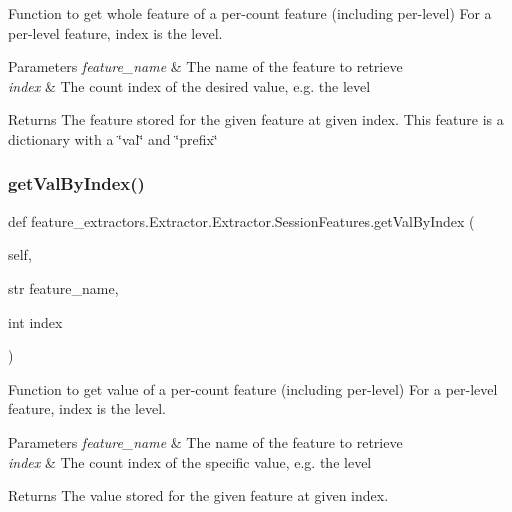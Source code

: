 Function to get whole feature of a per-\/count feature (including per-\/level) For a per-\/level feature, index is the level. 


\begin{DoxyParams}{Parameters}
{\em feature\+\_\+name} & The name of the feature to retrieve \\
\hline
{\em index} & The count index of the desired value, e.\+g. the level \\
\hline
\end{DoxyParams}
\begin{DoxyReturn}{Returns}
The feature stored for the given feature at given index. This feature is a dictionary with a \char`\"{}val\char`\"{} and \char`\"{}prefix\char`\"{} 
\end{DoxyReturn}
\mbox{\label{classfeature__extractors_1_1_extractor_1_1_extractor_1_1_session_features_a239bd49dfe33736f8c76edccfa7a50b2}} 
\subsubsection{\texorpdfstring{getValByIndex()}{getValByIndex()}}
{\footnotesize\ttfamily def feature\+\_\+extractors.\+Extractor.\+Extractor.\+Session\+Features.\+get\+Val\+By\+Index (\begin{DoxyParamCaption}\item[{}]{self,  }\item[{str}]{feature\+\_\+name,  }\item[{int}]{index }\end{DoxyParamCaption})}



Function to get value of a per-\/count feature (including per-\/level) For a per-\/level feature, index is the level. 


\begin{DoxyParams}{Parameters}
{\em feature\+\_\+name} & The name of the feature to retrieve \\
\hline
{\em index} & The count index of the specific value, e.\+g. the level \\
\hline
\end{DoxyParams}
\begin{DoxyReturn}{Returns}
The value stored for the given feature at given index. 
\end{DoxyReturn}
\mbox{\label{classfeature__extractors_1_1_extractor_1_1_extractor_1_1_session_features_a8debfe1452e37cf6129c4e14fbd0025d}} 

